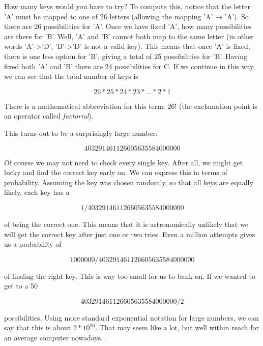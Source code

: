 \documentclass[UTF8]{book}
\begin{document}
\begin{CJK}{UTF8}{gbsn}
How many keys would you have to try? To compute this, notice that the letter 'A' must be mapped to one of 26 letters (allowing the mapping 'A' → 'A'). So there are 26 possibilities for 'A'. Once we have fixed 'A', how many possibilities are there for 'B'. Well, 'A' and 'B' cannot both map to the same letter (in other words 'A'->'D', 'B'->'D' is not a valid key). This means that once 'A' is fixed, there is one less option for 'B', giving a total of 25 possibilities for 'B'. Having fixed both 'A' and 'B' there are 24 possibilities for C. If we continue in this way, we can see that the total number of keys is

\[ 26*25*24*23* … * 2 * 1 \]

There is a mathematical abbreviation for this term: 26! (the exclamation point is an operator called \emph{factorial}).

This turns out to be a surprisingly large number:

\[ 403291461126605635584000000 \]

Of course we may not need to check every single key. After all, we might get lucky and find the correct key early on. We can express this in terms of probability. Assuming the key was chosen randomly, so that all keys are equally likely, each key has a

\[ 1/403291461126605635584000000 \]

of being the correct one. This means that it is astronomically unlikely that we will get the correct key after just one or two tries. Even a million attempts gives us a probability of

\[ 1000000/403291461126605635584000000 \]

of finding the right key. This is way too small for us to bank on. If we wanted to get to a 50%

\[ 403291461126605635584000000/2 \]

possibilities. Using more standard exponential notation for large numbers, we can say that this is about $2*10^{26}$. That may seem like a lot, but well within reach for an average computer nowadays.


\end{CJK}
\end{document}
